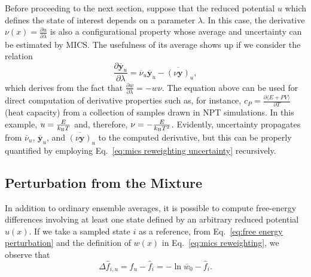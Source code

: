 \documentclass[
    journal=jctcce,
    layout=twocolumn
]{achemso}
\newcommand{\vt}[1]{\boldsymbol{\mathbf{#1}}}   %
\newcommand{\avg}[1]{\overline{#1}}             %
\begin{document}
Before proceeding to the next section, suppose that the reduced potential $u$ which defines the state of interest depends on a parameter $\lambda$. In this case, the derivative $\nu(x) = \frac{\partial u}{\partial \lambda}$ is also a configurational property whose average and uncertainty can be estimated by MICS. The usefulness of its average shows up if we consider the relation
\begin{equation*}
\frac{\partial \avg{\vt y}_u}{\partial \lambda} = \avg{\nu}_u \avg{\vt y}_u - \avg{(\nu \vt y)}_u,
\end{equation*}
which derives from the fact that $\frac{\partial w}{\partial \lambda} = - w \nu$. The equation above can be used for direct computation of derivative properties such as, for instance, $c_P = \frac{\partial \langle E + PV \rangle}{\partial T}$ (heat capacity) from a collection of samples drawn in NPT simulations. In this example, $u = \frac{E}{k_\text{\tiny B} T}$ and, therefore, $\nu = -\frac{E}{k_\text{\tiny B} T^2}$. Evidently, uncertainty propagates from $\avg{\nu}_u$, $\avg{\vt y}_u$, and $\avg{(\nu \vt y)}_u$ to the computed derivative, but this can be properly quantified by employing Eq.~\eqref{eq:mics reweighting uncertainty} recursively.

\subsection{Perturbation from the Mixture}

In addition to ordinary ensemble averages, it is possible to compute free-energy differences involving at least one state defined by an arbitrary reduced potential $u(x)$. If we take a sampled state $i$ as a reference, from Eq.~\eqref{eq:free energy perturbation} and the definition of $w(x)$ in Eq.~\eqref{eq:mics reweighting}, we observe that
\begin{equation}
\label{eq:mics fep}
\Delta {\hat f}_{i,u} = {\hat f}_u - {\hat f}_i = -\ln \avg{w}_0 - {\hat f}_i.
\end{equation}
\end{document}
